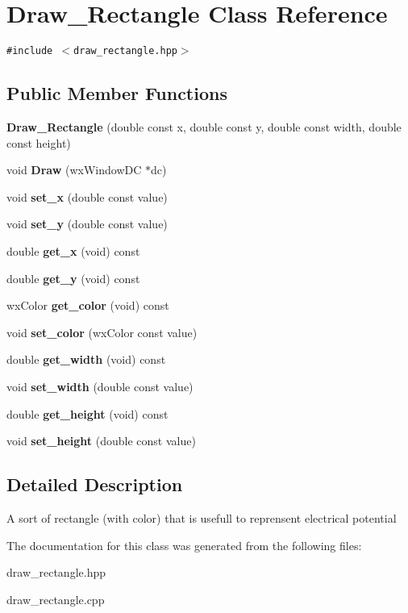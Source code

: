 \section{Draw\_\-Rectangle Class Reference}
\label{classDraw__Rectangle}
{\tt \#include $<$draw\_\-rectangle.hpp$>$}

\subsection*{Public Member Functions}
\begin{CompactItemize}
\item 
{\bf Draw\_\-Rectangle} (double const x, double const y, double const width, double const height)\label{classDraw__Rectangle_a0}

\item 
void {\bf Draw} (wx\-Window\-DC $\ast$dc)\label{classDraw__Rectangle_a1}

\item 
void {\bf set\_\-x} (double const value)\label{classDraw__Rectangle_a2}

\item 
void {\bf set\_\-y} (double const value)\label{classDraw__Rectangle_a3}

\item 
double {\bf get\_\-x} (void) const \label{classDraw__Rectangle_a4}

\item 
double {\bf get\_\-y} (void) const \label{classDraw__Rectangle_a5}

\item 
wx\-Color {\bf get\_\-color} (void) const \label{classDraw__Rectangle_a6}

\item 
void {\bf set\_\-color} (wx\-Color const value)\label{classDraw__Rectangle_a7}

\item 
double {\bf get\_\-width} (void) const \label{classDraw__Rectangle_a8}

\item 
void {\bf set\_\-width} (double const value)\label{classDraw__Rectangle_a9}

\item 
double {\bf get\_\-height} (void) const \label{classDraw__Rectangle_a10}

\item 
void {\bf set\_\-height} (double const value)\label{classDraw__Rectangle_a11}

\end{CompactItemize}


\subsection{Detailed Description}
A sort of rectangle (with color) that is usefull to reprensent electrical potential 



The documentation for this class was generated from the following files:\begin{CompactItemize}
\item 
draw\_\-rectangle.hpp\item 
draw\_\-rectangle.cpp\end{CompactItemize}
